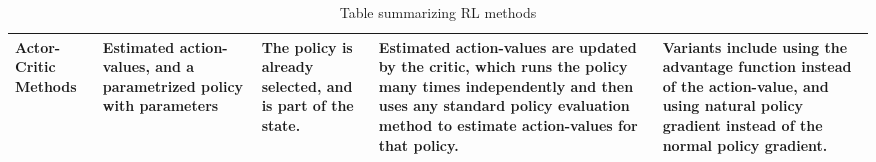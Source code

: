\documentclass{article}
\begin{document}
\begin{table}[htbp]
\begin{tabular}{|m{1.7cm}|m{2.8cm}|m{3cm}|m{4.5cm}|m{2.33cm}|}
Actor-Critic Methods & Estimated action-values, and a parametrized policy with parameters & The policy is already selected, and is part of the state. &  Estimated action-values are updated by the critic, which runs the policy many times independently and then uses any standard policy evaluation method to estimate action-values for that policy. & Variants include using the advantage function instead of the action-value, and using natural policy gradient instead of the normal policy gradient. \\ \hline
\end{tabular}
\caption{Table summarizing RL methods}
\label{table:rl_summary}
\end{table}
\end{document}
